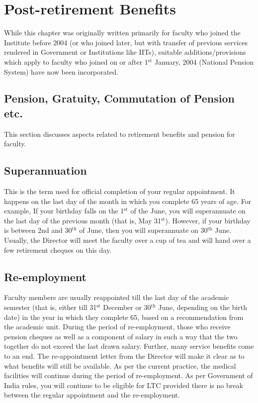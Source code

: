 \documentclass[
  10pt,
  a5paper,
  10pt,
  openany]{amsbook}
\begin{document}
\section{Post-retirement Benefits}\label{post-retirement-benefits}

While this chapter was originally written primarily for faculty who
joined the Institute before 2004 (or who joined later, but with transfer
of previous services rendered in Government or Institutions like IITs),
suitable additions/provisions which apply to faculty who joined on or
after 1\(^{\text{st}}\) January, 2004 (National Pension System) have now
been incorporated.

\subsection{Pension, Gratuity, Commutation of Pension
etc.}\label{pension-gratuity-commutation-of-pension-etc.}

This section discusses aspects related to retirement benefits and
pension for faculty.

\subsection{Superannuation}\label{superannuation}

This is the term used for official completion of your regular
appointment. It happens on the last day of the month in which you
complete 65 years of age. For example, If your birthday falls on the
1\(^{\text{st}}\) of the June, you will superannuate on the last day of
the previous month (that is, May 31\(^{\text{st}}\)). However, if your
birthday is between 2nd and 30\(^{\text{th}}\) of June, then you will
superannuate on 30\(^{\text{th}}\) June. Usually, the Director will meet
the faculty over a cup of tea and will hand over a few retirement
cheques on this day.

\subsection{Re-employment}\label{re-employment}

Faculty members are usually reappointed till the last day of the
academic semester (that is, either till 31\(^{\text{st}}\) December or
30\(^{\text{th}}\) June, depending on the birth date) in the year in
which they complete 65, based on a recommendation from the academic
unit. During the period of re-employment, those who receive pension
cheques as well as a component of salary in such a way that the two
together do not exceed the last drawn salary. Further, many service
benefits come to an end. The re-appointment letter from the Director
will make it clear as to what benefits will still be available. As per
the current practice, the medical facilities will continue during the
period of re-employment. As per Government of India rules, you will
continue to be eligible for LTC provided there is no break between the
regular appointment and the re-employment.
\end{document}

